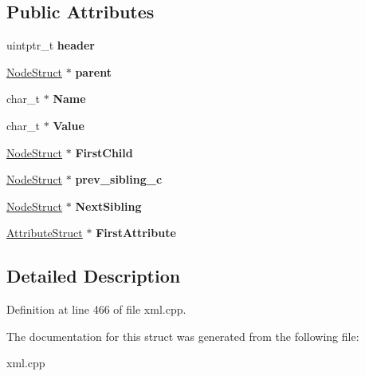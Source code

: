 \subsection*{Public Attributes}
\begin{DoxyCompactItemize}
\item 
\hypertarget{structphys_1_1xml_1_1NodeStruct_a68ff269f03bdab91cbeb96174d4df3a8}{
uintptr\_\-t {\bfseries header}}
\label{d7/dd5/structphys_1_1xml_1_1NodeStruct_a68ff269f03bdab91cbeb96174d4df3a8}

\item 
\hypertarget{structphys_1_1xml_1_1NodeStruct_a691cde3ddaad2c7dacf780a6c4b9c8fe}{
\hyperlink{structphys_1_1xml_1_1NodeStruct}{NodeStruct} $\ast$ {\bfseries parent}}
\label{d7/dd5/structphys_1_1xml_1_1NodeStruct_a691cde3ddaad2c7dacf780a6c4b9c8fe}

\item 
\hypertarget{structphys_1_1xml_1_1NodeStruct_ab27d7b1bf921844a9af1f4083f59f198}{
char\_\-t $\ast$ {\bfseries Name}}
\label{d7/dd5/structphys_1_1xml_1_1NodeStruct_ab27d7b1bf921844a9af1f4083f59f198}

\item 
\hypertarget{structphys_1_1xml_1_1NodeStruct_a183475da096134672af3de253b2cc4c3}{
char\_\-t $\ast$ {\bfseries Value}}
\label{d7/dd5/structphys_1_1xml_1_1NodeStruct_a183475da096134672af3de253b2cc4c3}

\item 
\hypertarget{structphys_1_1xml_1_1NodeStruct_ac4bc916ede972c2bef0ded054d703ae9}{
\hyperlink{structphys_1_1xml_1_1NodeStruct}{NodeStruct} $\ast$ {\bfseries FirstChild}}
\label{d7/dd5/structphys_1_1xml_1_1NodeStruct_ac4bc916ede972c2bef0ded054d703ae9}

\item 
\hypertarget{structphys_1_1xml_1_1NodeStruct_ab803e620f77fc53cdbb313702e9de966}{
\hyperlink{structphys_1_1xml_1_1NodeStruct}{NodeStruct} $\ast$ {\bfseries prev\_\-sibling\_\-c}}
\label{d7/dd5/structphys_1_1xml_1_1NodeStruct_ab803e620f77fc53cdbb313702e9de966}

\item 
\hypertarget{structphys_1_1xml_1_1NodeStruct_a45f6a03ead3f9f87d6d4e870dcbb57ad}{
\hyperlink{structphys_1_1xml_1_1NodeStruct}{NodeStruct} $\ast$ {\bfseries NextSibling}}
\label{d7/dd5/structphys_1_1xml_1_1NodeStruct_a45f6a03ead3f9f87d6d4e870dcbb57ad}

\item 
\hypertarget{structphys_1_1xml_1_1NodeStruct_a9ba833be049cf3440a71f8cdb89e54d7}{
\hyperlink{structphys_1_1xml_1_1AttributeStruct}{AttributeStruct} $\ast$ {\bfseries FirstAttribute}}
\label{d7/dd5/structphys_1_1xml_1_1NodeStruct_a9ba833be049cf3440a71f8cdb89e54d7}

\end{DoxyCompactItemize}


\subsection{Detailed Description}


Definition at line 466 of file xml.cpp.



The documentation for this struct was generated from the following file:\begin{DoxyCompactItemize}
\item 
xml.cpp\end{DoxyCompactItemize}
